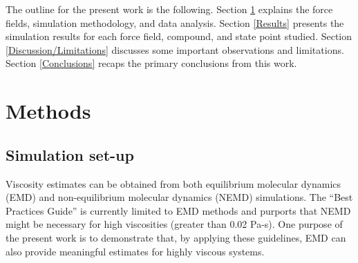 \documentclass[preprint,review,12pt]{elsarticle}
\begin{document}
    The outline for the present work is the following. Section \ref{Methods} explains the force fields, simulation methodology, and data analysis. Section \ref{Results} presents the simulation results for each force field, compound, and state point studied. Section \ref{Discussion/Limitations} discusses some important observations and limitations. Section \ref{Conclusions} recaps the primary conclusions from this work.
    	
	\section{Methods} \label{Methods}
	
	
	\subsection{Simulation set-up}
		
	Viscosity estimates can be obtained from both equilibrium molecular dynamics (EMD) and non-equilibrium molecular dynamics (NEMD) simulations. The ``Best Practices Guide'' is currently limited to EMD methods and purports that NEMD might be necessary for high viscosities (greater than 0.02 Pa-s). One purpose of the present work is to demonstrate that, by applying these guidelines, EMD can also provide meaningful estimates for highly viscous systems. 
	
	
%	
	
	
\end{document}
